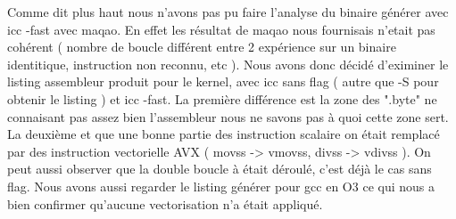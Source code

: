 \documentclass{report}
\begin{document}
Comme dit plus haut nous n'avons pas pu faire l'analyse du binaire générer avec icc -fast avec maqao. En effet les résultat de maqao nous fournisais n'etait pas cohérent 
( nombre de boucle différent entre 2 expérience sur un binaire identitique, instruction non reconnu, etc ). Nous avons donc décidé d'eximiner le listing assembleur produit pour le kernel,
 avec icc sans flag ( autre que -S pour obtenir le listing ) et icc -fast. La première différence est la zone des ".byte" ne connaisant pas assez bien l'assembleur nous ne savons pas à quoi cette zone sert.
La deuxième et que une bonne partie des instruction scalaire on était remplacé par des instruction vectorielle AVX
( movss -> vmovss, divss -> vdivss ). On peut aussi observer que la double boucle à était déroulé, c'est déjà le cas sans flag. Nous avons aussi regarder le listing générer pour gcc en O3 ce qui nous a bien confirmer qu'aucune vectorisation n'a était appliqué. 
\end{document}
